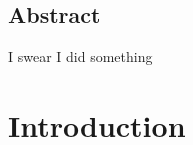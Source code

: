 \documentclass[english, a4paper, 12pt, twoside]{book}
\numberwithin{equation}{section} %
\begin{document}
{

}
\restoregeometry %

\thispagestyle{plain} %
\clearpage\mbox{}\clearpage %

\newpage

\section*{Abstract}
I swear I did something

\newpage


\newpage
\tableofcontents


\newpage
{} %
\setcounter{page}{1} %

\chapter{Introduction} %
\end{document}
